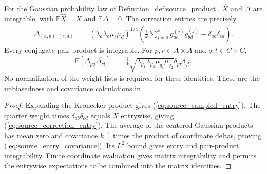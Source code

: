 \begin{theorem}
    \label{thm:source_unbiased}
    \leanok
    For the Gaussian probability law of Definition~\ref{def:source_product},
    $\widehat X$ and $\Delta$ are integrable, with
    $\mathbb E\widehat X=X$ and $\mathbb E\Delta=0$.
    The correction entries are precisely
    \begin{align}
        \Delta_{(a,b),(c,d)}
         & =(\lambda_a\lambda_b\mu_c\mu_d)^{1/4}
        \left(\frac1k\sum_{j=0}^{k-1}g^{(j)}_{ac}
        \overline{g^{(j)}_{bd}}-\delta_{ab}\delta_{cd}\right).
        \label{eq:source_correction_entry}
    \end{align}
    Every conjugate pair product is integrable. For $p,r\in A\times A$
    and $q,t\in C\times C$,
    \begin{align}
        \mathbb E[\Delta_{pq}\overline{\Delta_{rt}}]
         & =\frac1k\sqrt{\lambda_{p_1}\lambda_{p_2}\mu_{q_1}\mu_{q_2}}
        \delta_{pr}\delta_{qt}.
        \label{eq:source_entry_covariance}
    \end{align}
    No normalization of the weight lists is required for these identities.
    These are the unbiasedness and covariance calculations in
    \cite[Equation~(5.6) and Equations~(5.7)--(5.8)]{OpenAI2026PolynomialPEPS}.
\end{theorem}

\begin{proof}\leanok
    Expanding the Kronecker product gives (\ref{eq:source_sampled_entry}).
    The quarter weight times $\delta_{ab}\delta_{cd}$ equals $X$ entrywise,
    giving (\ref{eq:source_correction_entry}). The average of the centered
    Gaussian products has mean zero and covariance $k^{-1}$ times the
    product of coordinate deltas, proving (\ref{eq:source_entry_covariance}).
    Its $L^2$ bound gives entry and pair-product integrability. Finite
    coordinate evaluation gives matrix integrability and permits the
    entrywise expectations to be combined into the matrix identities.
\end{proof}

